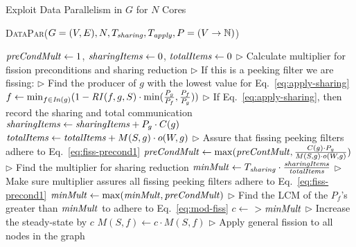 \begin{algorithm}[t]
\caption{Exploit Data Parallelism in $G$ for $N$
  Cores} \label {alg:data-parallelize}
\footnotesize
\textsc{DataPar}($G=(V, E), N, T_{\relax{\it sharing}},
T_{\relax{\it apply}}, P=(V \rightarrow \mathbb{N}) $)
\begin{algorithmic}[1]
\State $\relax{\it preCondMult} \gets 1$, $\relax{\it sharingItems} \gets 0$, $\relax{\it totalItems} \gets 0$
\State $\triangleright$ Calculate multiplier for fission preconditions and sharing reduction
\State $\triangleright$ If this is a peeking filter we are fissing:
\State $\triangleright$ Find the producer of $g$ with the lowest
value for Eq.~\ref{eq:apply-sharing}
\State $f \gets \min_{f \in \relax{\it In}(g)} (1 -\relax{\it RI}(f,g, S) \cdot
\min(\frac{P_g}{P_f},\frac{P_f}{P_g} )) $
\label{ln:dp1}
\State $\triangleright$ If Eq.~\ref{eq:apply-sharing},
then record the sharing and total communication
\State $\relax{\it sharingItems} \gets \relax{\it sharingItems} + P_g \cdot C(g)$
\State $\relax{\it totalItems} \gets \relax{\it totalItems} + M(S,g) \cdot o(W, g)$
\EndIf 
\State $\triangleright$ Assure that fissing peeking filters adhere to Eq.~\ref{eq:fiss-precond1}
\State $\relax{\it preCondMult} \gets \max(\relax{\it preContMult}, \frac{C(g) \cdot P_g}{M(S,g)
 \cdot o(W,g)})$  
\label{ln:dp3}
\EndIf
\EndFor
\State $\triangleright$ Find the multiplier for sharing reduction
\State $\relax{\it minMult} \gets T_{\relax{\it sharing}} \cdot \frac{\relax{\it sharingItems}
}{\relax{\it totalItems}}$
\label{ln:dp2}
\State $\triangleright$ Make sure multiplier assures all fissing peeking filters
adhere to  Eq.~\ref{eq:fiss-precond1}
\State $\relax{\it minMult} \gets \max(\relax{\it minMult}, \relax{\it preCondMult})$
\State $\triangleright$ Find the LCM of the $P_f$'s
greater than $\relax{\it minMult}$ to adhere to Eq.~\ref{eq:mod-fiss}
\State $c \gets $ $ >
\relax{\it minMult}$
\label{ln:dp4}
\State $\triangleright$ Increase the steady-state by $c$
\State $M(S,f) \gets c \cdot M(S, f)$
\EndFor
\State $\triangleright$ Apply general fission to all nodes in the graph
\State {}
\EndFor
\end{algorithmic}
\end{algorithm}



